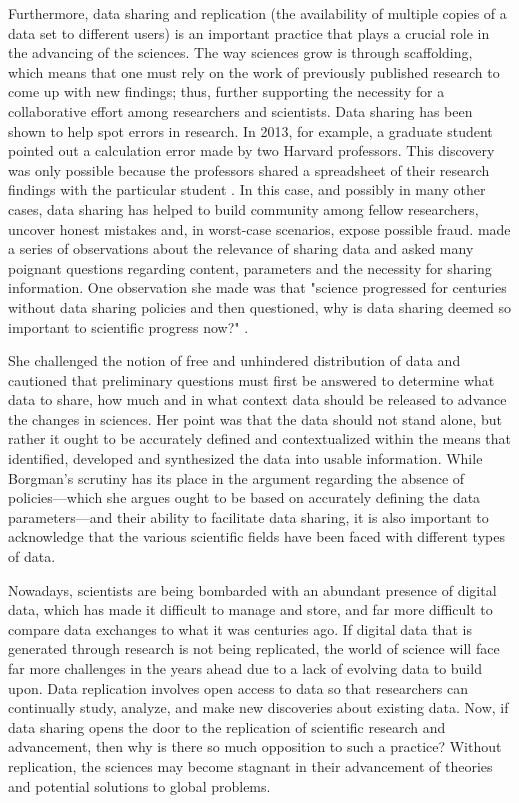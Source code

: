 \documentclass[sigconf]{acmart}
\begin{document}
Furthermore, data sharing and replication (the availability of multiple copies of a data set to different users) is an important practice that plays a crucial role in the advancing of the sciences. The way sciences grow is through scaffolding, which means that one must rely on the work of previously published research to come up with new findings; thus, further supporting the necessity for a collaborative effort among researchers and scientists. Data sharing has been shown to help spot errors in research. In 2013, for example, a graduate student pointed out a calculation error made by two Harvard professors. This discovery was only possible because the professors shared a spreadsheet of their research findings with the particular student \cite{leetaru2016}. In this case, and possibly in many other cases, data sharing has helped to build community among fellow researchers, uncover honest mistakes and, in worst-case scenarios, expose possible fraud. \cite{borgman2015if} made a series of observations about the relevance of sharing data and asked many poignant questions regarding content, parameters and the necessity for sharing information. One observation she made was that "science progressed for centuries without data sharing policies and then questioned, why is data sharing deemed so important to scientific progress now?" \cite{borgman2015if}. 

She challenged the notion of free and unhindered distribution of data and cautioned that preliminary questions must first be answered to determine what data to share, how much and in what context data should be released to advance the changes in sciences. Her point was that the data should not stand alone, but rather it ought to be accurately defined and contextualized within the means that identified, developed and synthesized the data into usable information. While Borgman's scrutiny has its place in the argument regarding the absence of policies—which she argues ought to be based on accurately defining the data parameters—and their ability to facilitate data sharing, it is also important to acknowledge that the various scientific fields have been faced with different types of data. 

Nowadays, scientists are being bombarded with an abundant presence of digital data, which has made it difficult to manage and store, and far more difficult to compare data exchanges to what it was centuries ago. If digital data that is generated through research is not being replicated, the world of science will face far more challenges in the years ahead due to a lack of evolving data to build upon. Data replication involves open access to data so that researchers can continually study, analyze, and make new discoveries about existing data. Now, if data sharing opens the door to the replication of scientific research and advancement, then why is there so much opposition to such a practice? Without replication, the sciences may become stagnant in their advancement of theories and potential solutions to global problems.
\end{document}
